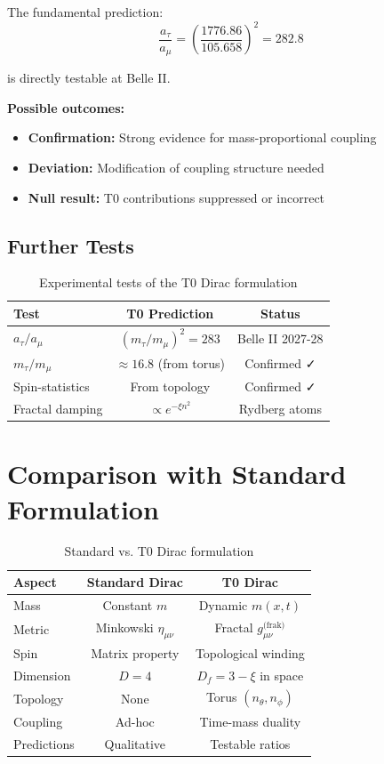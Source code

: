 	The fundamental prediction:
	\begin{equation}
		\frac{a_\tau}{a_\mu} = \left(\frac{1776.86}{105.658}\right)^2 = 282.8
	\end{equation}
	
	is directly testable at Belle II.
	
	\textbf{Possible outcomes:}
	\begin{itemize}
		\item \textbf{Confirmation:} Strong evidence for mass-proportional coupling
		\item \textbf{Deviation:} Modification of coupling structure needed
		\item \textbf{Null result:} T0 contributions suppressed or incorrect
	\end{itemize}
	
	\subsection{Further Tests}
	
	\begin{table}[h]
		\centering
		\begin{tabular}{lcc}
			\toprule
			\textbf{Test} & \textbf{T0 Prediction} & \textbf{Status} \\
			\midrule
			$a_\tau/a_\mu$ & $(m_\tau/m_\mu)^2 = 283$ & Belle II 2027-28 \\
			$m_\tau/m_\mu$ & $\approx 16.8$ (from torus) & Confirmed ✓ \\
			Spin-statistics & From topology & Confirmed ✓ \\
			Fractal damping & $\propto e^{-\xi n^2}$ & Rydberg atoms \\
			\bottomrule
		\end{tabular}
		\caption{Experimental tests of the T0 Dirac formulation}
	\end{table}
	
	\section{Comparison with Standard Formulation}
	
	\begin{table}[h]
		\centering
		\begin{tabular}{lcc}
			\toprule
			\textbf{Aspect} & \textbf{Standard Dirac} & \textbf{T0 Dirac} \\
			\midrule
			Mass & Constant $m$ & Dynamic $m(x,t)$ \\
			Metric & Minkowski $\eta_{\mu\nu}$ & Fractal $g_{\mu\nu}^{\text{(frak)}}$ \\
			Spin & Matrix property & Topological winding \\
			Dimension & $D = 4$ & $D_f = 3 - \xi$ in space \\
			Topology & None & Torus $(n_\theta, n_\phi)$ \\
			Coupling & Ad-hoc & Time-mass duality \\
			Predictions & Qualitative & Testable ratios \\
			\bottomrule
		\end{tabular}
		\caption{Standard vs. T0 Dirac formulation}
	\end{table}
	
